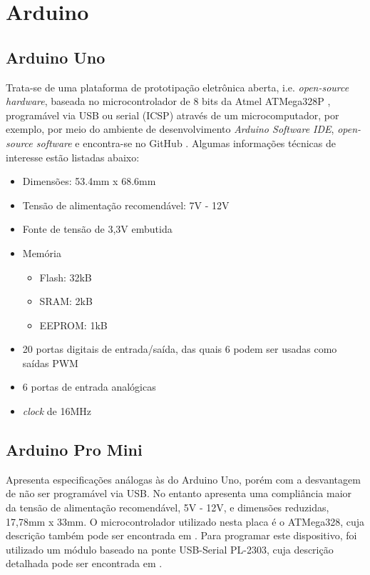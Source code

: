\section{Arduino}
\subsection{Arduino Uno}
Trata-se de uma plataforma de prototipação eletrônica aberta, i.e. \textit{open-source hardware}, baseada no microcontrolador de 8 bits da Atmel 
ATMega328P \cite{ATMega}, programável via USB ou serial (ICSP) através de um microcomputador, por exemplo, por meio do ambiente de desenvolvimento 
\textit{Arduino Software IDE}, \textit{open-source software} e encontra-se no GitHub \cite{ArduSoft}.
Algumas informações técnicas \cite{ArduInfo} de interesse estão listadas abaixo: 
\begin{itemize}
 \item Dimensões: 53.4mm x 68.6mm
 \item Tensão de alimentação recomendável: 7V - 12V
 \item Fonte de tensão de 3,3V embutida
 \item Memória 
 \begin{itemize}
  \item Flash: 32kB 
  \item SRAM: 2kB
  \item EEPROM: 1kB
 \end{itemize}

 \item 20 portas digitais de entrada/saída, das quais 6 podem ser usadas como saídas PWM
 \item 6 portas de entrada analógicas
 \item \textit{clock} de 16MHz
\end{itemize}

\subsection{Arduino Pro Mini} %
Apresenta especificações análogas às do Arduino Uno, porém com a desvantagem de não ser programável via USB.
No entanto apresenta uma compliância maior da tensão de alimentação recomendável, 5V - 12V, e dimensões reduzidas, 17,78mm x 33mm.
O microcontrolador utilizado nesta placa é o ATMega328, cuja descrição também pode ser encontrada em \cite{ATMega}.
Para programar este dispositivo, foi utilizado um módulo baseado na ponte USB-Serial PL-2303, cuja descrição detalhada pode ser encontrada em 
\cite{PL2303}.

